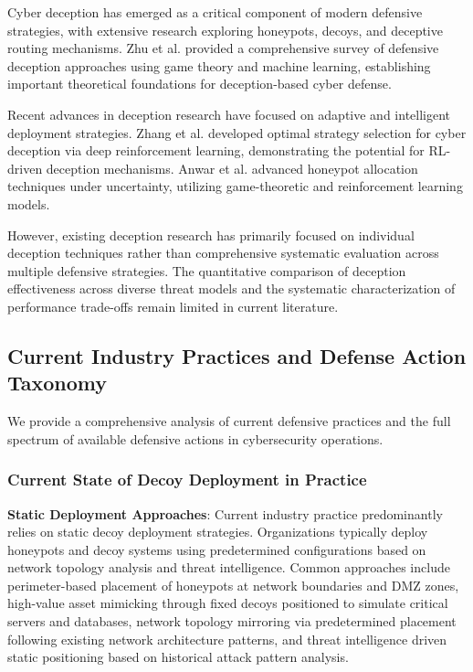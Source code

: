\documentclass[12pt,oneside]{article}
\begin{document}
Cyber deception has emerged as a critical component of modern defensive strategies, with extensive research exploring honeypots, decoys, and deceptive routing mechanisms. Zhu et al. \cite{zhu2021survey} provided a comprehensive survey of defensive deception approaches using game theory and machine learning, establishing important theoretical foundations for deception-based cyber defense.

Recent advances in deception research have focused on adaptive and intelligent deployment strategies. Zhang et al. \cite{zhang2022optimal} developed optimal strategy selection for cyber deception via deep reinforcement learning, demonstrating the potential for RL-driven deception mechanisms. Anwar et al. \cite{anwar2022honeypot} advanced honeypot allocation techniques under uncertainty, utilizing game-theoretic and reinforcement learning models.

However, existing deception research has primarily focused on individual deception techniques rather than comprehensive systematic evaluation across multiple defensive strategies. The quantitative comparison of deception effectiveness across diverse threat models and the systematic characterization of performance trade-offs remain limited in current literature.

\subsection{Current Industry Practices and Defense Action Taxonomy}

We provide a comprehensive analysis of current defensive practices and the full spectrum of available defensive actions in cybersecurity operations.

\subsubsection{Current State of Decoy Deployment in Practice}

\textbf{Static Deployment Approaches}: Current industry practice predominantly relies on static decoy deployment strategies. Organizations typically deploy honeypots and decoy systems using predetermined configurations based on network topology analysis and threat intelligence. Common approaches include perimeter-based placement of honeypots at network boundaries and DMZ zones, high-value asset mimicking through fixed decoys positioned to simulate critical servers and databases, network topology mirroring via predetermined placement following existing network architecture patterns, and threat intelligence driven static positioning based on historical attack pattern analysis.
\end{document}
